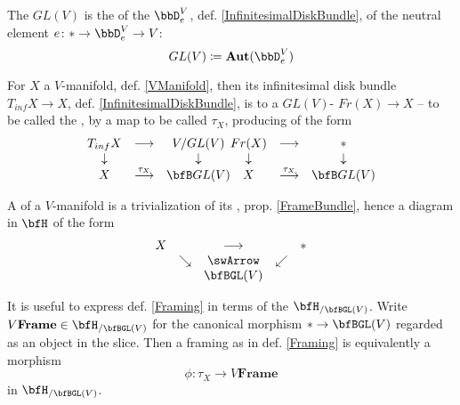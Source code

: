\begin{defn}
\label{GeneralLinearGroup}\hypertarget{GeneralLinearGroup}{}
The  $GL(V)$ is the  of the  $\bbD^V_e$, def. \ref{InfinitesimalDiskBundle}, of the neutral element $e \colon \ast \to \bbD^V_e \to V$:
\begin{displaymath}
GL(V) \coloneqq \mathbf{Aut}(\bbD^V_e)
\end{displaymath}
\end{defn}
\begin{prop}
\label{FrameBundle}\hypertarget{FrameBundle}{}
For $X$ a $V$-manifold, def. \ref{VManifold}, then its infinitesimal disk bundle $T_{inf} X \to X$, def. \ref{InfinitesimalDiskBundle}, is  to a $GL(V)$- $Fr(X) \to X$ -- to be called the ,  by a map to be called $\tau_X$, producing  of the form
\begin{displaymath}
\itexarray{
T_{inf} X &\longrightarrow& V/GL(V)
\\
\downarrow && \downarrow
\\
X &\stackrel{\tau_X}{\longrightarrow}& \bfB GL(V)
}

\itexarray{
Fr(X) &\longrightarrow& \ast
\\
\downarrow && \downarrow
\\
X &\stackrel{\tau_X}{\longrightarrow}& \bfB GL(V)
}
\end{displaymath}
\end{prop}
\begin{defn}
\label{Framing}\hypertarget{Framing}{}
A  of a $V$-manifold is a trivialization of its , prop. \ref{FrameBundle}, hence a diagram in $\bfH$ of the form
\begin{displaymath}
\itexarray{
X && \longrightarrow && \ast
\\
& \searrow &\swArrow& \swarrow
\\
&& \bfBGL(V)
}
\end{displaymath}
\end{defn}
\begin{remark}
\label{ModuliForFramings}\hypertarget{ModuliForFramings}{}
It is useful to express def. \ref{Framing} in terms of the  $\bfH_{/\bfBGL(V)}$. Write $V\mathbf{Frame}\in \bfH_{/\bfBGL(V)}$ for the canonical morphism $\ast \to \bfBGL(V)$ regarded as an object in the slice. Then a framing as in def. \ref{Framing} is equivalently a morphism
\begin{displaymath}
\phi \colon \tau_X \longrightarrow V\mathbf{Frame}
\end{displaymath}
in $\bfH_{/\bfBGL(V)}$.
\end{remark}
